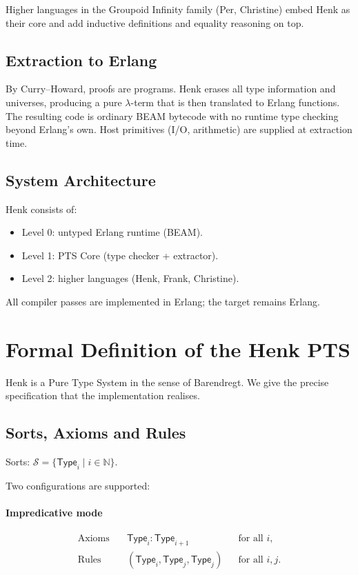 \documentclass{article}
\begin{document}
Higher languages in the Groupoid Infinity family (Per, Christine) embed Henk as their core and add inductive definitions and equality reasoning on top.

\subsection{Extraction to Erlang}
By Curry--Howard, proofs are programs. Henk erases all type information and universes, producing a pure $\lambda$-term that is then translated to Erlang functions.
The resulting code is ordinary BEAM bytecode with no runtime type checking beyond Erlang's own. Host primitives (I/O, arithmetic) are supplied at extraction time.

\subsection{System Architecture}
Henk consists of:
\begin{itemize}
\item Level 0: untyped Erlang runtime (BEAM).
\item Level 1: PTS Core (type checker + extractor).
\item Level 2: higher languages (Henk, Frank, Christine).
\end{itemize}

All compiler passes are implemented in Erlang; the target remains Erlang.

\section{Formal Definition of the Henk PTS}

Henk is a Pure Type System in the sense of Barendregt. We give the precise specification that the implementation realises.

\subsection{Sorts, Axioms and Rules}

Sorts: $\mathcal{S} = \{\mathsf{Type}_i \mid i \in \mathbb{N}\}$.

Two configurations are supported:

\paragraph{Impredicative mode}
\begin{align*}
\text{Axioms} &\quad \mathsf{Type}_i : \mathsf{Type}_{i+1} &&\text{for all } i, \\
\text{Rules}  &\quad (\mathsf{Type}_i, \mathsf{Type}_j, \mathsf{Type}_j) &&\text{for all } i,j.
\end{align*}
\end{document}
